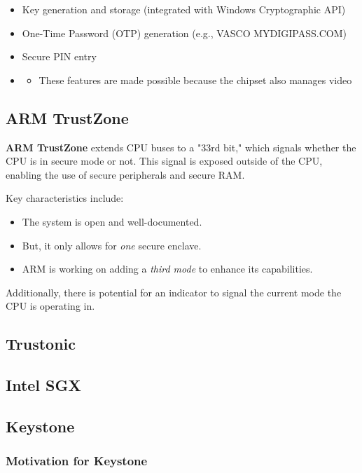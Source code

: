 \begin{itemize}
    \item Key generation and storage (integrated with Windows Cryptographic API)
    \item One-Time Password (OTP) generation (e.g., VASCO MYDIGIPASS.COM)
    \item Secure PIN entry
    \item \begin{itemize}
        \item These features are made possible because the chipset also manages video
    \end{itemize}
\end{itemize}

\subsection{ARM TrustZone}

\textbf{ARM TrustZone} extends CPU buses to a "33rd bit," which signals whether the CPU is in secure mode or not. This signal is exposed outside of the CPU, enabling the use of secure peripherals and secure RAM. 

Key characteristics include:
\begin{itemize}
    \item The system is open and well-documented.
    \item But, it only allows for \textit{one} secure enclave.
    \item ARM is working on adding a \textit{third mode} to enhance its capabilities.
\end{itemize}

Additionally, there is potential for an indicator to signal the current mode the CPU is operating in.

\subsection{Trustonic}

\subsection{Intel SGX}

\subsection{Keystone}

\subsubsection{Motivation for Keystone}

